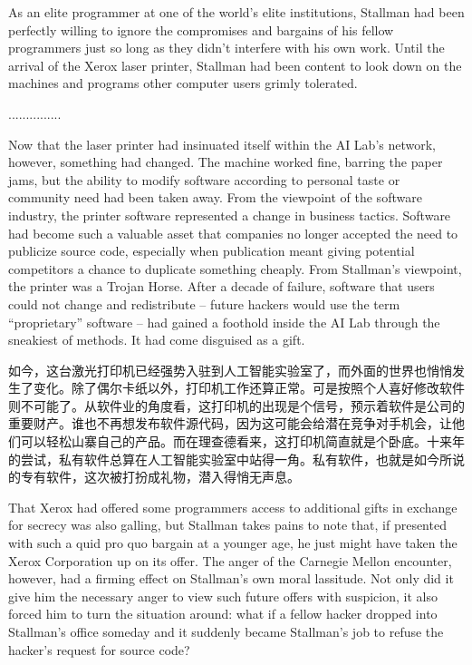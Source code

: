 \ifdefined\eng
As an elite programmer at one of the world's elite institutions, Stallman had been perfectly willing to ignore the compromises and bargains of his fellow programmers just so long as they didn't interfere with his own work. Until the arrival of the Xerox laser printer, Stallman had been content to look down on the machines and programs other computer users grimly tolerated.
\fi

\ifdefined\chs
...............
\fi

\ifdefined\eng
Now that the laser printer had insinuated itself within the AI Lab's network, however, something had changed. The machine worked fine, barring the paper jams, but the ability to modify software according to personal taste or community need had been taken away. From the viewpoint of the software industry, the printer software represented a change in business tactics. Software had become such a valuable asset that companies no longer accepted the need to publicize source code, especially when publication meant giving potential competitors a chance to duplicate something cheaply. From Stallman's viewpoint, the printer was a Trojan Horse. After a decade of failure, software that users could not change and redistribute -- future hackers would use the term ``proprietary'' software -- had gained a foothold inside the AI Lab through the sneakiest of methods. It had come disguised as a gift.
\fi

\ifdefined\chs
如今，这台激光打印机已经强势入驻到人工智能实验室了，而外面的世界也悄悄发生了变化。除了偶尔卡纸以外，打印机工作还算正常。可是按照个人喜好修改软件则不可能了。从软件业的角度看，这打印机的出现是个信号，预示着软件是公司的重要财产。谁也不再想发布软件源代码，因为这可能会给潜在竞争对手机会，让他们可以轻松山寨自己的产品。而在理查德看来，这打印机简直就是个卧底。十来年的尝试，私有软件总算在人工智能实验室中站得一角。私有软件，也就是如今所说的专有软件，这次被打扮成礼物，潜入得悄无声息。
\fi

\ifdefined\eng
That Xerox had offered some programmers access to additional gifts in exchange for secrecy was also galling, but Stallman takes pains to note that, if presented with such a quid pro quo bargain at a younger age, he just might have taken the Xerox Corporation up on its offer. The anger of the Carnegie Mellon encounter, however, had a firming effect on Stallman's own moral lassitude. Not only did it give him the necessary anger to view such future offers with suspicion, it also forced him to turn the situation around: what if a fellow hacker dropped into Stallman's office someday and it suddenly became Stallman's job to refuse the hacker's request for source code?
\fi

